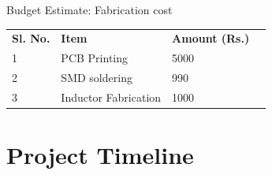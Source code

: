 \documentclass[aspectratio=169]{beamer}
\begin{document}
	
	\begin{frame}{Budget Estimate: Fabrication cost}
		\begin{table}[]
			\begin{tabular}{|l|l|l|l}
				\cline{1-3}
				\textbf{Sl. No.} & \textbf{Item}        & \textbf{Amount (Rs.)} &  \\ \cline{1-3}
				1                & PCB Printing         & 5000                    &  \\ \cline{1-3}
				2                & SMD soldering        & 990                    &  \\ \cline{1-3}
				3                & Inductor Fabrication & 1000                  &  \\ \cline{1-3}
			\end{tabular}
		\end{table}
	\end{frame}
	
	
	\section{Project Timeline}

	
	
\end{document}

